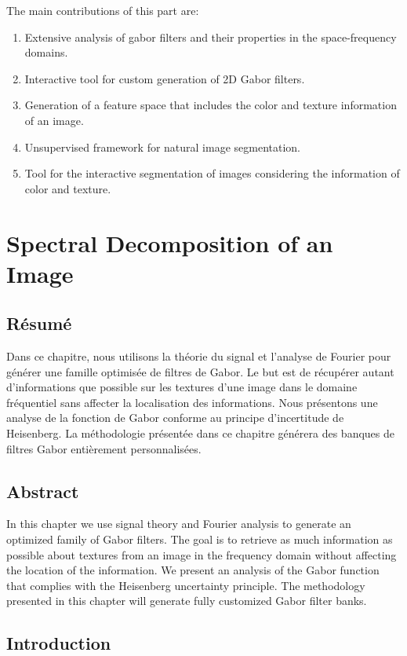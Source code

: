 The main contributions of this part are:
\begin{enumerate}
	\item Extensive analysis of gabor filters and their properties in the space-frequency domains.
	\item Interactive tool for custom generation of 2D Gabor filters.
	\item Generation of a feature space that includes the color and texture information of an image.
	\item Unsupervised framework for natural image segmentation.
	\item Tool for the interactive segmentation of images considering the information of color and texture.
\end{enumerate}

\chapter{Spectral Decomposition of an Image}\label{ch:spectral_image_decomposition}

\section*{Résumé}
\noindent Dans ce chapitre, nous utilisons la théorie du signal et l'analyse de Fourier pour générer une famille optimisée de filtres de Gabor. Le but est de récupérer autant d'informations que possible sur les textures d'une image dans le domaine fréquentiel sans affecter la localisation des informations. Nous présentons une analyse de la fonction de Gabor conforme au principe d'incertitude de Heisenberg. La méthodologie présentée dans ce chapitre générera des banques de filtres Gabor entièrement personnalisées. 

\section*{Abstract}
\noindent In this chapter we use signal theory and Fourier analysis to generate an optimized family of Gabor filters. The goal is to retrieve as much information as possible about textures from an image in the frequency domain without affecting the location of the information. We present an analysis of the Gabor function that complies with the Heisenberg uncertainty principle. The methodology presented in this chapter will generate fully customized Gabor filter banks. 

\section{Introduction}

